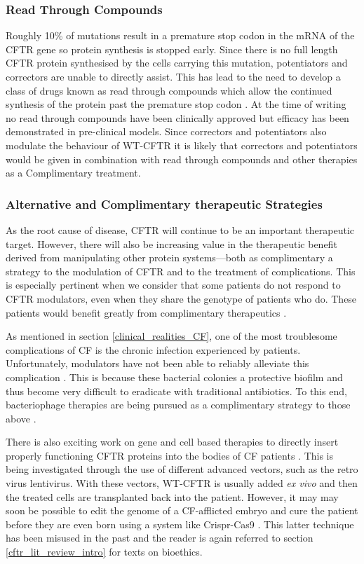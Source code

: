 \subsubsection{Read Through Compounds}
Roughly 10\% of mutations result in a premature stop codon in the mRNA of the CFTR gene so protein synthesis is stopped early. Since there is no full length CFTR protein synthesised by the cells carrying this mutation, potentiators and correctors are unable to directly assist. This has lead to the need to develop a class of drugs known as read through compounds which allow the continued synthesis of the protein past the premature stop codon \cite{sharma2021}. At the time of writing no read through compounds have been clinically approved but efficacy has been demonstrated in pre-clinical models\cite{crawford2021}. Since correctors and potentiators also modulate the behaviour of WT-CFTR it is likely that correctors and potentiators would be given in combination with read through compounds and other therapies as a Complimentary treatment.

\subsubsection{Alternative and Complimentary therapeutic Strategies}
As the root cause of disease, CFTR will continue to be an important therapeutic target. However, there will also be increasing value in the therapeutic benefit derived from manipulating other protein systems---both as complimentary a strategy to the modulation of CFTR and to the treatment of complications. This is especially pertinent when we consider that some patients do not respond to CFTR modulators, even when they share the genotype of patients who do. These patients would benefit greatly from complimentary therapeutics \cite{hanafin2021, robertson2015, lingam2017, seelig2020, barbieri2021a, grebert2019}. 

As mentioned in section \ref{clinical_realities_CF}, one of the most troublesome complications of CF is the chronic infection experienced by patients. Unfortunately, modulators have not been able to reliably alleviate this complication \cite{mallapaty2022}. This is because these bacterial colonies a protective biofilm and thus become very difficult to eradicate with traditional antibiotics. To this end, bacteriophage therapies are being pursued as a complimentary strategy to those above \cite{ng2021}. 

There is also exciting work on gene and cell based therapies to directly insert properly functioning CFTR proteins into the bodies of CF patients \cite{allan2021}. This is being investigated through the use of different advanced vectors, such as the retro virus lentivirus. With these vectors, WT-CFTR is usually added \textit{ex vivo} and then the treated cells are transplanted back into the patient. However, it may may soon be possible to edit the genome of a CF-afflicted embryo and cure the patient before they are even born using a system like Crispr-Cas9 \cite{ledford2020}. This latter technique has been misused in the past \cite{mallapaty2022} and the reader is again referred to section \ref{cftr_lit_review_intro} for texts on bioethics. 

